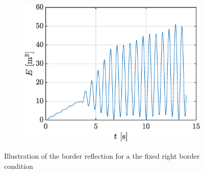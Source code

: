 \documentclass[a4paper,12pt,twoside]{article}
\begin{document}
\begin{figure}[h!]
    \centering
    \begin{subfigure}{0.5\textwidth}
    \includegraphics[width=\textwidth]{graphs/ex1Efixe.eps}
    \end{subfigure}

    \caption{Illustration of the border reflection for a the fixed right border condition}
    \label{fig:ex1fix}
    \end{figure}

    \lipsum[1-2] %
\end{document}

